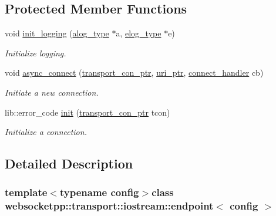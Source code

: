 \subsection*{Protected Member Functions}
\begin{DoxyCompactItemize}
\item 
void \hyperlink{classwebsocketpp_1_1transport_1_1iostream_1_1endpoint_a0c3fbf85313521d6d3a9a53faa2084ae}{init\+\_\+logging} (\hyperlink{classwebsocketpp_1_1transport_1_1iostream_1_1endpoint_af176dc3a44caefab71de271c27873c81}{alog\+\_\+type} $\ast$a, \hyperlink{classwebsocketpp_1_1transport_1_1iostream_1_1endpoint_a0aafebd80866c13bef4caa45e48a8ede}{elog\+\_\+type} $\ast$e)
\begin{DoxyCompactList}\small\item\em Initialize logging. \end{DoxyCompactList}\item 
void \hyperlink{classwebsocketpp_1_1transport_1_1iostream_1_1endpoint_a72e24fecb98d0445eb7df64d6b94a6a8}{async\+\_\+connect} (\hyperlink{classwebsocketpp_1_1transport_1_1iostream_1_1endpoint_a709bba4a4e1e2b7829abe4aa55de8078}{transport\+\_\+con\+\_\+ptr}, \hyperlink{namespacewebsocketpp_aae370ea5ac83a8ece7712cb39fc23f5b}{uri\+\_\+ptr}, \hyperlink{namespacewebsocketpp_1_1transport_ac392fca34e946b48414278c0c3addfa5}{connect\+\_\+handler} cb)
\begin{DoxyCompactList}\small\item\em Initiate a new connection. \end{DoxyCompactList}\item 
lib\+::error\+\_\+code \hyperlink{classwebsocketpp_1_1transport_1_1iostream_1_1endpoint_a9e169a6551db86bd1147b314924bd353}{init} (\hyperlink{classwebsocketpp_1_1transport_1_1iostream_1_1endpoint_a709bba4a4e1e2b7829abe4aa55de8078}{transport\+\_\+con\+\_\+ptr} tcon)
\begin{DoxyCompactList}\small\item\em Initialize a connection. \end{DoxyCompactList}\end{DoxyCompactItemize}


\subsection{Detailed Description}
\subsubsection*{template$<$typename config$>$class websocketpp\+::transport\+::iostream\+::endpoint$<$ config $>$}



